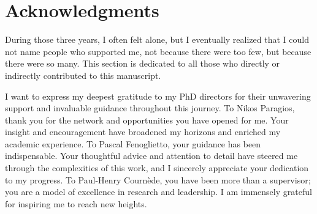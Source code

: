 \chapter*{Acknowledgments}
During those three years, I often felt alone, but I eventually realized that I could not name people who supported me, not because there were too few, but because there were so many.
This section is dedicated to all those who directly or indirectly contributed to this manuscript.\n


I want to express my deepest gratitude to my PhD directors for their unwavering support and invaluable guidance throughout this journey.\n
To Nikos Paragios, thank you for the network and opportunities you have opened for me.
Your insight and encouragement have broadened my horizons and enriched my academic experience.\n
To Pascal Fenoglietto, your guidance has been indispensable.
Your thoughtful advice and attention to detail have steered me through the complexities of this work, and I sincerely appreciate your dedication to my progress.\n
To Paul-Henry Cournède, you have been more than a supervisor; you are a model of excellence in research and leadership.
I am immensely grateful for inspiring me to reach new heights.\n


